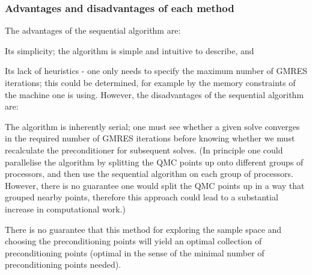 \subsubsection{Advantages and disadvantages of each method}

The advantages of the sequential algorithm are:
\bit
\item Its simplicity; the algorithm is simple and intuitive to describe, and
\item Its lack of heuristics - one only needs to specify the maximum number of GMRES iterations; this could be determined, for example by the memory constraints of the machine one is using.
    \eit
    However, the disadvantages of the sequential algorithm are:
    \bit
  \item The algorithm is inherently serial; one must see whether a given solve converges in the required number of GMRES iterations before knowing whether we must recalculate the preconditioner for subsequent solves. (In principle one could parallelise the algorithm by splitting the QMC points up onto different groups of processors, and then use the sequential algorithm on each group of processors. However, there is no guarantee one would split the QMC points up in a way that grouped nearby points, therefore this approach could lead to a substantial increase in computational work.)
    \item There is no guarantee that this method for exploring the sample space and choosing the preconditioning points will yield an optimal collection of preconditioning points (optimal in the sense of the minimal number of preconditioning points needed).
    \eit

